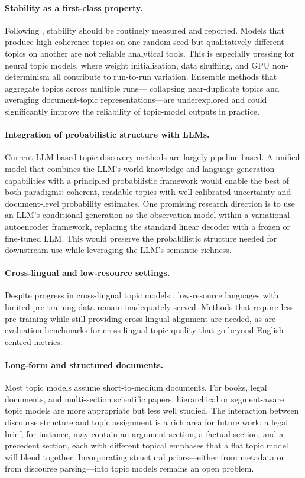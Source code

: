 \documentclass[11pt,a4paper]{article}
\begin{document}
\paragraph{Stability as a first-class property.}
Following \textcite{koltcov2014lda}, stability should be routinely
measured and reported.
Models that produce high-coherence topics on one random seed but
qualitatively different topics on another are not reliable analytical
tools.
This is especially pressing for neural topic models, where weight
initialisation, data shuffling, and GPU non-determinism all contribute
to run-to-run variation.
Ensemble methods that aggregate topics across multiple runs---
collapsing near-duplicate topics and averaging document-topic
representations---are underexplored and could significantly improve
the reliability of topic-model outputs in practice.

\paragraph{Integration of probabilistic structure with LLMs.}
Current LLM-based topic discovery methods are largely pipeline-based.
A unified model that combines the LLM's world knowledge and language
generation capabilities with a principled probabilistic framework
would enable the best of both paradigms: coherent, readable topics
with well-calibrated uncertainty and document-level probability
estimates.
One promising research direction is to use an LLM's conditional
generation as the observation model within a variational
autoencoder framework, replacing the standard linear decoder with
a frozen or fine-tuned LLM.
This would preserve the probabilistic structure needed for downstream
use while leveraging the LLM's semantic richness.

\paragraph{Cross-lingual and low-resource settings.}
Despite progress in cross-lingual topic models
\parencite{bianchi2021crosslingual,mimno2009polylingual}, low-resource
languages with limited pre-training data remain inadequately served.
Methods that require less pre-training while still providing
cross-lingual alignment are needed, as are evaluation benchmarks
for cross-lingual topic quality that go beyond English-centred metrics.

\paragraph{Long-form and structured documents.}
Most topic models assume short-to-medium documents.
For books, legal documents, and multi-section scientific papers,
hierarchical or segment-aware topic models are more appropriate but
less well studied.
The interaction between discourse structure and topic assignment is a
rich area for future work: a legal brief, for instance, may contain
an argument section, a factual section, and a precedent section, each
with different topical emphases that a flat topic model will blend
together.
Incorporating structural priors---either from metadata or from
discourse parsing---into topic models remains an open problem.
\end{document}
